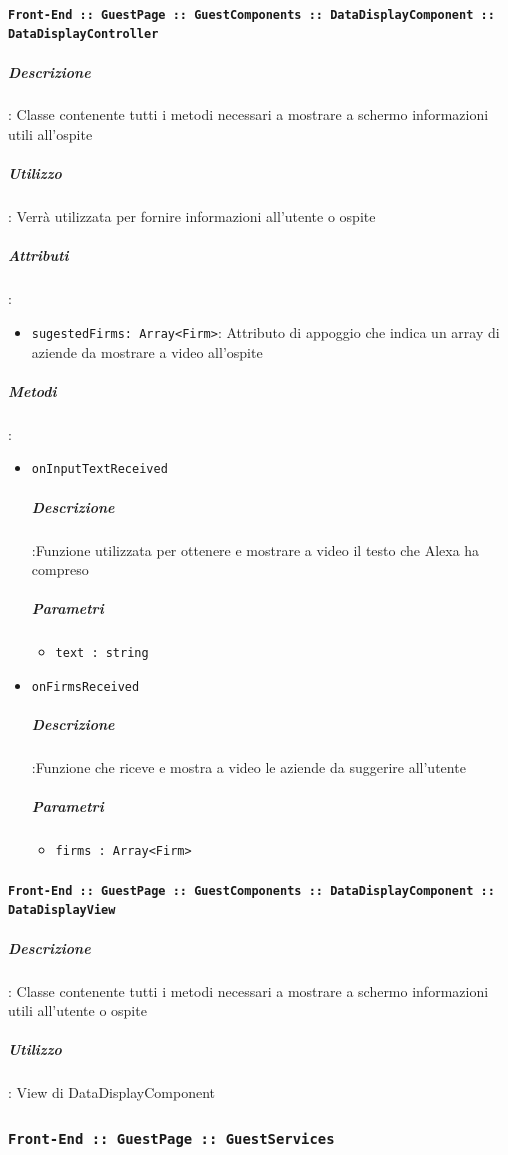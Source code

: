 \documentclass[../DefinizioneDiProdotto_v3.0.0.tex]{subfiles}
\begin{document}
			\paragraph{\texttt{Front-End :: GuestPage :: GuestComponents :: DataDisplayComponent :: DataDisplayController}}
				\subparagraph{Descrizione}: Classe contenente tutti i metodi necessari a mostrare a schermo informazioni utili all'ospite
				\subparagraph{Utilizzo}: Verrà utilizzata per fornire informazioni all'utente o ospite
				\subparagraph{Attributi}:
				\begin{itemize}
					\item \texttt{sugestedFirms: Array<Firm>}: Attributo di appoggio che indica un array di aziende da mostrare a video all'ospite
				\end{itemize}
				\subparagraph{Metodi}:
				\begin{itemize}
					\item \texttt{onInputTextReceived}
					\subparagraph{Descrizione}:Funzione utilizzata per ottenere e mostrare a video il testo che Alexa ha compreso
					\subparagraph{Parametri}\begin{itemize}
						\item \texttt{text : string}
					\end{itemize}

					\item \texttt{onFirmsReceived}
					\subparagraph{Descrizione}:Funzione che riceve e mostra a video le aziende da suggerire all'utente
					\subparagraph{Parametri}\begin{itemize}
						\item \texttt{firms : Array<Firm>}
					\end{itemize}

				\end{itemize}\vspace{0.5em}
			\paragraph{\texttt{Front-End :: GuestPage :: GuestComponents :: DataDisplayComponent :: DataDisplayView}}

				\subparagraph{Descrizione}: Classe contenente tutti i metodi necessari a mostrare a schermo informazioni utili all'utente o ospite
				\subparagraph{Utilizzo}: View di DataDisplayComponent

	\newpage
	\subsubsection{\texttt{Front-End :: GuestPage :: GuestServices}}
\end{document}
